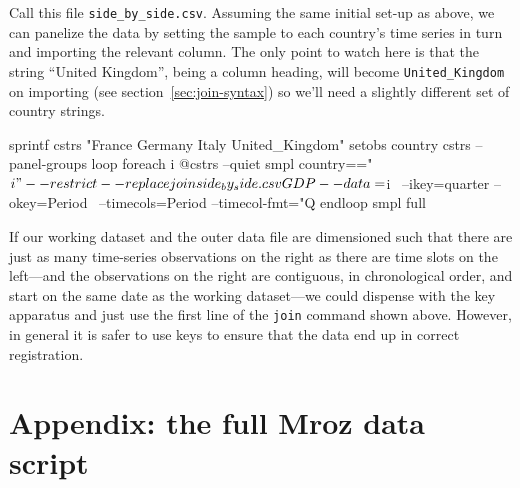 Call this file \verb|side_by_side.csv|.  Assuming the same initial
set-up as above, we can panelize the data by setting the sample to
each country's time series in turn and importing the relevant
column. The only point to watch here is that the string ``United
Kingdom'', being a column heading, will become \verb|United_Kingdom|
on importing (see section~\ref{sec:join-syntax}) so we'll need a
slightly different set of country strings.
%
\begin{code}
sprintf cstrs "France Germany Italy United_Kingdom"
setobs country cstrs --panel-groups
loop foreach i @cstrs --quiet
  smpl country=="$i" --restrict --replace
  join side_by_side.csv GDP --data=$i \
  --ikey=quarter --okey=Period \
  --timecols=Period --timecol-fmt="Q%
endloop
smpl full
\end{code}

If our working dataset and the outer data file are dimensioned such
that there are just as many time-series observations on the right as
there are time slots on the left---and the observations on the right
are contiguous, in chronological order, and start on the same date as
the working dataset---we could dispense with the key apparatus and
just use the first line of the \texttt{join} command shown
above. However, in general it is safer to use keys to ensure that the
data end up in correct registration.


\clearpage

\section*{Appendix: the full Mroz data script}


